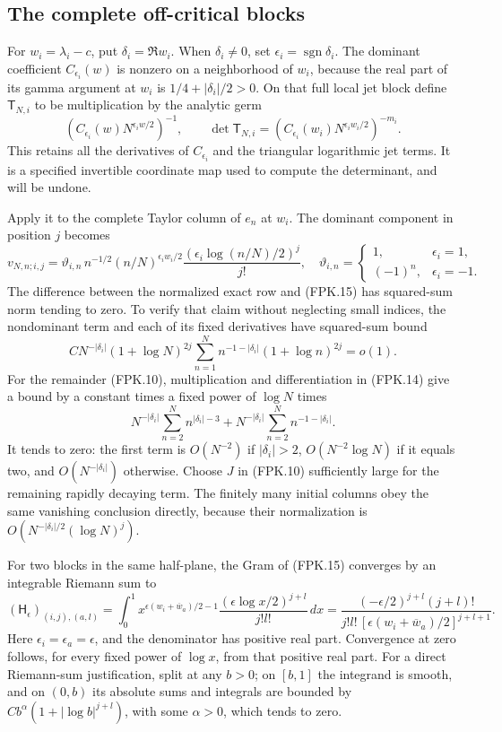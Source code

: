 \subsection{The complete off-critical blocks}

For $w_i=\lambda_i-c$, put $\delta_i=\Re w_i$. When
$\delta_i\ne0$, set $\epsilon_i=\operatorname{sgn}\delta_i$.
The dominant coefficient $C_{\epsilon_i}(w)$ is nonzero on a
neighborhood of $w_i$, because the real part of its gamma argument
at $w_i$ is $1/4+|\delta_i|/2>0$. On that full local jet block
define $\mathsf T_{N,i}$ to be multiplication by the analytic germ
\[
 \left(C_{\epsilon_i}(w)N^{\epsilon_i w/2}\right)^{-1},
 \qquad \det\mathsf T_{N,i}
       =\left(C_{\epsilon_i}(w_i)N^{\epsilon_iw_i/2}\right)^{-m_i}.
 \tag{FPK.14}
\]
This retains all the derivatives of $C_{\epsilon_i}$ and the
triangular logarithmic jet terms. It is a specified invertible
coordinate map used to compute the determinant, and will be undone.

Apply it to the complete Taylor column of $e_n$ at $w_i$. The
dominant component in position $j$ becomes
\[
 v_{N,n;i,j}
  =\vartheta_{i,n}\,n^{-1/2}(n/N)^{\epsilon_iw_i/2}
             \frac{(\epsilon_i\log(n/N)/2)^j}{j!},
 \quad
 \vartheta_{i,n}=\begin{cases}1,&\epsilon_i=1,\\(-1)^n,&\epsilon_i=-1.
 \end{cases}
 \tag{FPK.15}
\]
The difference between the normalized exact row and (FPK.15) has
squared-sum norm tending to zero. To verify that
claim without neglecting small indices, the nondominant term and
each of its fixed derivatives have squared-sum bound
\[
 C N^{-|\delta_i|}(1+\log N)^{2j}
       \sum_{n=1}^N n^{-1-|\delta_i|}(1+\log n)^{2j}=o(1).
\]
For the remainder (FPK.10), multiplication and differentiation in
(FPK.14) give a bound by a constant times a fixed power of $\log N$
times
\[
 N^{-|\delta_i|}\sum_{n=2}^N n^{|\delta_i|-3}
       +N^{-|\delta_i|}\sum_{n=2}^N n^{-1-|\delta_i|}.
\]
It tends to zero: the first term is $O(N^{-2})$ if
$|\delta_i|>2$, $O(N^{-2}\log N)$ if it equals two, and
$O(N^{-|\delta_i|})$ otherwise. Choose $J$ in (FPK.10) sufficiently
large for the remaining rapidly decaying term. The finitely many
initial columns obey the same vanishing conclusion directly, because
their normalization is $O(N^{-|\delta_i|/2}(\log N)^j)$.

For two blocks in the same half-plane, the Gram of (FPK.15) converges
by an integrable Riemann sum to
\[
 (\mathsf H_\epsilon)_{(i,j),(a,l)}
  =\int_0^1 x^{\epsilon(w_i+\overline w_a)/2-1}
       \frac{(\epsilon\log x/2)^{j+l}}{j!l!}\,dx
  =\frac{(-\epsilon/2)^{j+l}(j+l)!}
      {j!l!\,[\epsilon(w_i+\overline w_a)/2]^{j+l+1}}.
 \tag{FPK.16}
\]
Here $\epsilon_i=\epsilon_a=\epsilon$, and the denominator has
positive real part. Convergence at zero follows, for every fixed
power of $\log x$, from that positive real part. For a direct
Riemann-sum justification, split at any $b>0$; on $[b,1]$ the
integrand is smooth, and on $(0,b)$ its absolute sums and integrals
are bounded by $C b^\alpha(1+|\log b|^{j+l})$, with some
$\alpha>0$, which tends to zero.

